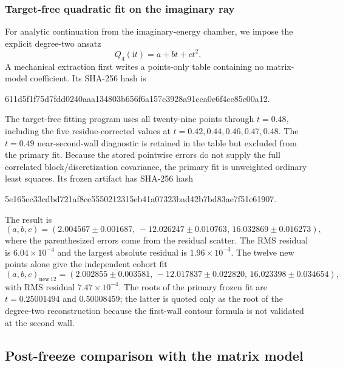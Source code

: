 \documentclass[11pt]{article}
\newcommand{\ii}{\mathrm{i}}
\begin{document}
\subsubsection{Target-free quadratic fit on the imaginary ray}

For analytic continuation from the imaginary-energy chamber, we impose the
explicit degree-two ansatz
\begin{equation}
  Q_4(\ii t)=a+bt+ct^2.
  \label{eq:Q4-fit-ansatz}
\end{equation}
A mechanical extraction first writes a points-only table containing no
matrix-model coefficient.  Its SHA-256 hash is
\begin{center}
\small\ttfamily
611d5f1f75d7fdd0240aaa134803b656f6a157c3928a91cca0e6f4cc85c00a12.
\end{center}
The target-free fitting program uses all twenty-nine points through $t=0.48$,
including the five residue-corrected values at
$t=0.42,0.44,0.46,0.47,0.48$.  The $t=0.49$ near-second-wall diagnostic is
retained in the table but excluded from the primary fit.  Because the stored
pointwise errors do not supply the full correlated block/discretization
covariance, the primary fit is unweighted ordinary least squares.  Its frozen
artifact has SHA-256 hash
\begin{center}
\small\ttfamily
5e165ec33cdbd721af8ce5550212315eb41a07323bad42b7bd83ae7f51e61907.
\end{center}
The result is
\begin{equation}
  \boxed{
  (a,b,c)=
  (2.004567\mathbin{\pm}0.001687,\,
   -12.026247\mathbin{\pm}0.010763,\,
   16.032869\mathbin{\pm}0.016273),}
  \label{eq:Q4-imaginary-fit}
\end{equation}
where the parenthesized errors come from the residual scatter.  The RMS
residual is $6.04\times10^{-4}$ and the largest absolute residual is
$1.96\times10^{-3}$.  The twelve new points alone give the independent cohort
fit
\begin{equation}
  (a,b,c)_{\mathrm{new\,12}}
  =(2.002855\mathbin{\pm}0.003581,\,
    -12.017837\mathbin{\pm}0.022820,\,
    16.023398\mathbin{\pm}0.034654),
  \label{eq:Q4-imaginary-fit-new12}
\end{equation}
with RMS residual $7.47\times10^{-4}$.  The roots of the primary frozen fit
are $t=0.25001494$ and $0.50008459$; the latter is quoted only as the root of
the degree-two reconstruction because the first-wall contour formula is not
validated at the second wall.

\subsection{Post-freeze comparison with the matrix model}
\end{document}
